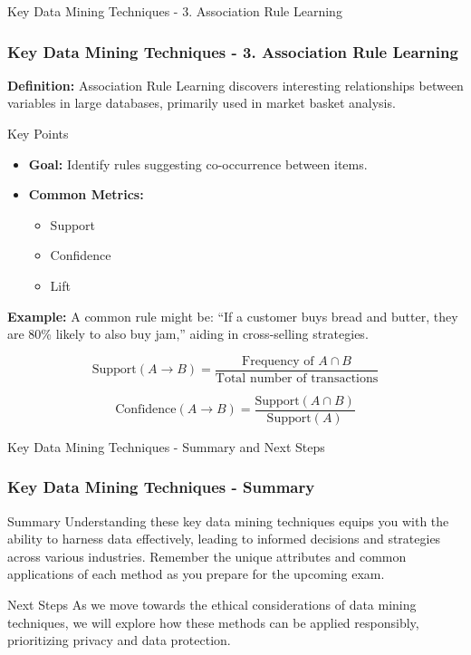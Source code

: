 \documentclass[aspectratio=169]{beamer}
\begin{document}
\begin{frame}[fragile]{Key Data Mining Techniques - 3. Association Rule Learning}
    \frametitle{Key Data Mining Techniques - 3. Association Rule Learning}
    
    \textbf{Definition:} Association Rule Learning discovers interesting relationships between variables in large databases, primarily used in market basket analysis.

    \begin{block}{Key Points}
        \begin{itemize}
            \item \textbf{Goal:} Identify rules suggesting co-occurrence between items.
            \item \textbf{Common Metrics:}
                \begin{itemize}
                    \item Support
                    \item Confidence
                    \item Lift
                \end{itemize}
        \end{itemize}
    \end{block}
    
    \textbf{Example:} 
    A common rule might be: “If a customer buys bread and butter, they are 80\% likely to also buy jam,” aiding in cross-selling strategies.

    \begin{equation}
        \text{Support}(A \rightarrow B) = \frac{\text{Frequency of } A \cap B}{\text{Total number of transactions}}
    \end{equation}
    
    \begin{equation}
        \text{Confidence}(A \rightarrow B) = \frac{\text{Support}(A \cap B)}{\text{Support}(A)}
    \end{equation}
\end{frame}

\begin{frame}[fragile]{Key Data Mining Techniques - Summary and Next Steps}
    \frametitle{Key Data Mining Techniques - Summary}
    
    \begin{block}{Summary}
        Understanding these key data mining techniques equips you with the ability to harness data effectively, leading to informed decisions and strategies across various industries. Remember the unique attributes and common applications of each method as you prepare for the upcoming exam.
    \end{block}

    \smallskip
    \begin{block}{Next Steps}
        As we move towards the ethical considerations of data mining techniques, we will explore how these methods can be applied responsibly, prioritizing privacy and data protection.
    \end{block}
\end{frame}
\end{document}
